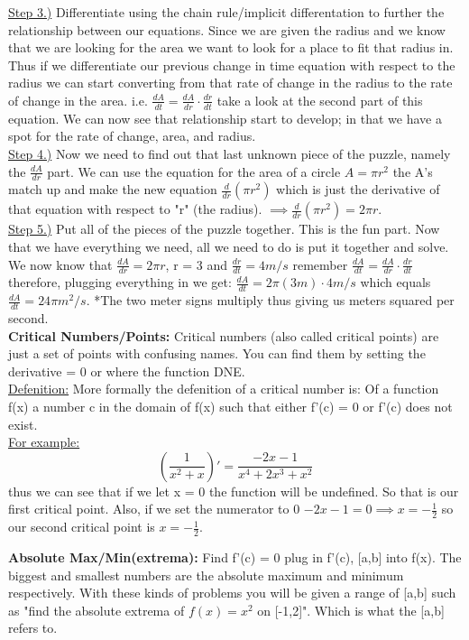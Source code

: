 \documentclass[fleqn]{article}
\begin{document}
\underline{Step 3.)} Differentiate using the chain rule/implicit differentation to further the relationship between our equations. Since we are given the radius and we know that we are looking for the area we want to look for a place to fit that radius in. Thus if we differentiate our previous change in time equation with respect to the radius we can start converting from that rate of change in the radius to the rate of change in the area. i.e. $\frac{dA}{dt} = \frac{dA}{dr} \cdot \frac{dr}{dt}$ take a look at the second part of this equation. We can now see that relationship start to develop; in that we have a spot for the rate of change, area, and radius.  
\\

\underline{Step 4.)} Now we need to find out that last unknown piece of the puzzle, namely the $\frac{dA}{dr}$ part. We can use the equation for the area of a circle $A = \pi r^2$ the A's match up and make the new equation $\frac{d}{dr}(\pi r^2)$ which is just the derivative of that equation with respect to "r" (the radius). $\implies \frac{d}{dr}(\pi r^2) = 2\pi r$.
\\

\underline{Step 5.)} Put all of the pieces of the puzzle together. This is the fun part. Now that we have everything we need, all we need to do is put it together and solve. We now know that $\frac{dA}{dr} = 2\pi r$, r = 3 and $\frac{dr}{dt} = 4 m/s$ remember $\frac{dA}{dt} = \frac{dA}{dr} \cdot \frac{dr}{dt}$ therefore, plugging everything in we get: $\frac{dA}{dt} = 2 \pi (3m) \cdot 4m/s$ which equals $\frac{dA}{dt} = 24\pi m^2/s$. *The two meter signs multiply thus giving us meters squared per second. 
\\

\textbf{Critical Numbers/Points: }
Critical numbers (also called critical points) are just a set of points with confusing names. You can find them by setting the derivative = 0 or where the function DNE.  
\\

\underline{Defenition:} More formally the defenition of a critical number is: Of a function f(x) a number c in the domain of f(x) such that either f'(c) = 0 or f'(c) does not exist.
\\

\underline{For example:} \[(\frac{1}{x^2+x})' = \frac{-2x-1}{x^4+2x^3+x^2}\] thus we can see that if we let x = 0 the function will be undefined. So that is our first critical point. Also, if we set the numerator to 0 $-2x-1=0 \implies x = - \frac{1}{2}$ so our second critical point is $x = -\frac{1}{2}$.

\textbf{Absolute Max/Min(extrema): } Find f'(c) = 0 plug in f'(c), [a,b] into f(x). The biggest and smallest numbers are the absolute maximum and minimum respectively. With these kinds of problems you will be given a range of [a,b] such as "find the absolute extrema of $f(x) = x^2$ on [-1,2]". Which is what the [a,b] refers to. 
\end{document}
